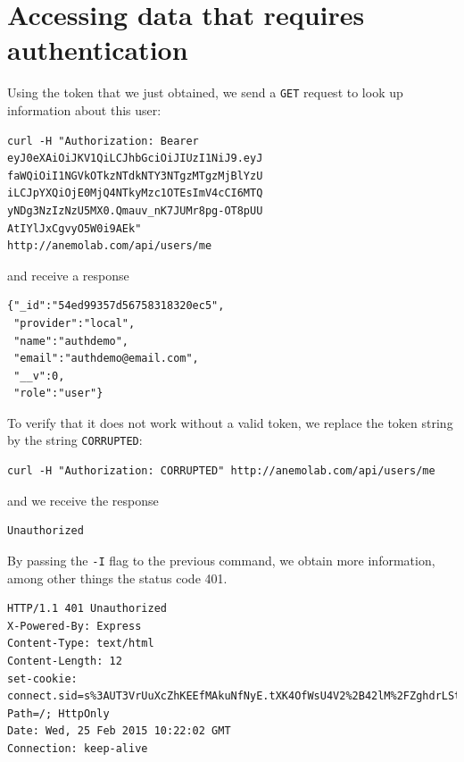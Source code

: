 \documentclass{article}
\begin{document}
\section{Accessing data that requires authentication}
Using the token that we just obtained, we send a \texttt{GET} request to look up information about this user:
\begin{verbatim}
curl -H "Authorization: Bearer 
eyJ0eXAiOiJKV1QiLCJhbGciOiJIUzI1NiJ9.eyJ
faWQiOiI1NGVkOTkzNTdkNTY3NTgzMTgzMjBlYzU
iLCJpYXQiOjE0MjQ4NTkyMzc1OTEsImV4cCI6MTQ
yNDg3NzIzNzU5MX0.Qmauv_nK7JUMr8pg-OT8pUU
AtIYlJxCgvyO5W0i9AEk" 
http://anemolab.com/api/users/me
\end{verbatim}
and receive a response
\begin{verbatim}
{"_id":"54ed99357d56758318320ec5",
 "provider":"local",
 "name":"authdemo",
 "email":"authdemo@email.com",
 "__v":0,
 "role":"user"}
\end{verbatim}
To verify that it does not work without a valid token, we replace the token string by the string \texttt{CORRUPTED}:
\begin{verbatim}
curl -H "Authorization: CORRUPTED" http://anemolab.com/api/users/me
\end{verbatim}
and we receive the response
\begin{verbatim}
Unauthorized
\end{verbatim}
By passing the \texttt{-I} flag to the previous command, we obtain more information, among other things the status code 401.
\begin{verbatim}
HTTP/1.1 401 Unauthorized
X-Powered-By: Express
Content-Type: text/html
Content-Length: 12
set-cookie: connect.sid=s%3AUT3VrUuXcZhKEEfMAkuNfNyE.tXK4OfWsU4V2%2B42lM%2FZghdrLStgVhQP6jevF%2BjfA3zQ; Path=/; HttpOnly
Date: Wed, 25 Feb 2015 10:22:02 GMT
Connection: keep-alive
\end{verbatim}
\end{document}
